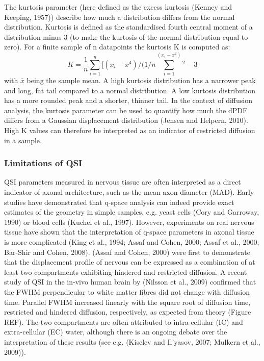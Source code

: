 The kurtosis parameter (here defined as the excess kurtosis (Kenney and Keeping, 1957))  describe how much a distribution differs from the normal distribution. Kurtosis is defined as the standardised fourth central moment of a distribution minus 3 (to make the kurtosis of the normal distribution equal to zero). For a finite sample of n datapoints the kurtosis K is computed as:
\begin{equation}
	K=\frac{1}{n} \sum_{i=1}^{n} [(x_i-x^4)/(1/n ∑_{i=1}^(x_i-x^2)^2-3
\end{equation}
with $\bar{x}$ being the sample mean. A high kurtosis distribution has a narrower peak and long, fat tail compared to a normal distribution. A low kurtosis distribution has a more rounded peak and a shorter, thinner tail. In the context of diffusion analysis, the kurtosis parameter can be used to quantify how much the dPDF differs from a Gaussian displacement distribution (Jensen and Helpern, 2010). High K values can therefore be interpreted as an indicator of restricted diffusion in a sample.

\subsubsection*{Limitations of QSI}
QSI parameters measured in nervous tissue are often interpreted as a direct indicator of axonal architecture, such as the mean axon diameter (MAD).  Early studies have demonstrated that q-space analysis can indeed provide exact estimates of the geometry in simple samples, e.g. yeast cells (Cory and Garroway, 1990) or blood cells (Kuchel et al., 1997). However, experiments on real nervous tissue have shown that the interpretation of q-space parameters in axonal tissue is more complicated (King et al., 1994; Assaf and Cohen, 2000; Assaf et al., 2000; Bar-Shir and Cohen, 2008). (Assaf and Cohen, 2000) were first to demonstrate that the displacement profile of nervous can be expressed as a combination of at least two compartments exhibiting hindered and restricted diffusion. A recent study of QSI in the in-vivo human brain by (Nilsson et al., 2009) confirmed that the FWHM perpendicular to white matter fibres did not change with diffusion time. Parallel FWHM increased linearly with the square root of diffusion time, restricted and hindered diffusion, respectively, as expected from theory (Figure REF). The two compartments are often attributed to intra-cellular (IC) and extra-cellular (EC) water, although there is an ongoing debate over the interpretation of these results (see e.g. (Kiselev and Il'yasov, 2007; Mulkern et al., 2009)).

